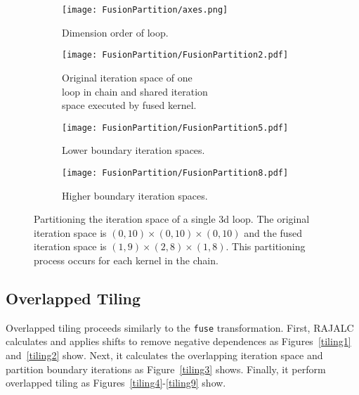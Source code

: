 \begin{figure}
	\captionsetup[subfigure]{justification=centering}
		\centering
		\begin{subfigure}[t]{0.33\textwidth}
			\centering
			\texttt{[image: FusionPartition/axes.png]}
			\caption{Dimension order of loop.}
		\end{subfigure}
		
		
		\begin{subfigure}[t]{0.45\textwidth}
			\centering
			\texttt{[image: FusionPartition/FusionPartition2.pdf]}
			\caption{Original iteration space of one \\ loop in chain and shared iteration \\ space executed by fused kernel.}\label{sharedSpace}
		\end{subfigure}
		\begin{subfigure}[t]{0.45\textwidth}
			\centering
			\texttt{[image: FusionPartition/FusionPartition5.pdf]}
			\caption{Lower boundary iteration spaces.}\label{preshare}
		\end{subfigure}
	
		\begin{subfigure}[t]{0.5\textwidth}
			\centering
			\texttt{[image: FusionPartition/FusionPartition8.pdf]}
			\caption{Higher boundary iteration spaces.}\label{postshare}
		\end{subfigure}
	\caption{Partitioning the iteration space of a single 3d loop. The original iteration space is $(0,10)\times(0,10)\times(0,10)$ and the fused iteration space is $(1,9)\times(2,8)\times(1,8)$. This partitioning process occurs for each kernel in the chain.}\label{fusionPartition}
	\end{figure}
	


\subsection{Overlapped Tiling}

Overlapped tiling proceeds similarly to the \verb.fuse. transformation. 
First, RAJALC calculates and applies shifts to remove negative dependences as
Figures~\ref{tiling1} and~\ref{tiling2} show.
Next, it calculates the overlapping iteration space and partition boundary
iterations as Figure~\ref{tiling3} shows.
Finally, it perform overlapped tiling as Figures~\ref{tiling4}-\ref{tiling9} show.

